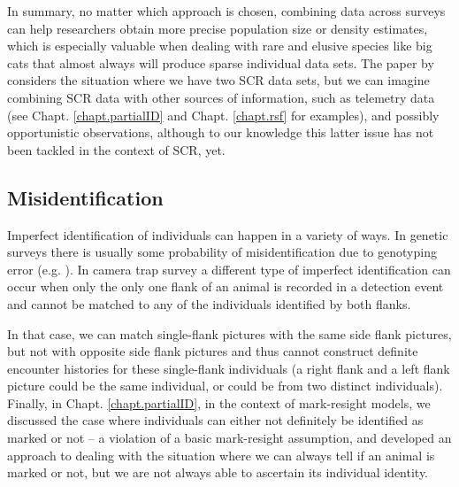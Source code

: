 In summary, no matter which approach is chosen, combining data across
surveys can help researchers %
obtain more precise population size or
density
estimates, which is especially valuable when dealing with rare and
elusive species like big cats that almost always will produce sparse
individual data sets.
The paper by \citet{gopalaswamy_etal:2012mee} considers the
situation where we have two SCR data sets, but we can imagine
combining SCR data with other sources of information, such as
telemetry data (see Chapt. \ref{chapt.partialID} and
Chapt. \ref{chapt.rsf} for examples), and possibly opportunistic
observations, although to our knowledge this latter issue has not been
tackled in the context of SCR, yet.


\subsection{Misidentification}

Imperfect identification of individuals can happen in a variety of
ways. In genetic surveys there is usually some probability of
misidentification due to genotyping error
(e.g. \citet{lukacs_burnham:2005}). In camera trap survey a different
type of imperfect identification can occur when only the only one
flank of an animal is recorded in a detection event and %
cannot be matched to any of the individuals identified by both flanks.

In that case, we can match single-flank pictures with the same
side flank pictures, but not with opposite side flank pictures and
thus cannot construct definite encounter histories for these
single-flank individuals (a right flank and a left flank picture could
be the same individual, or could be from two distinct
individuals). Finally, in Chapt. \ref{chapt.partialID}, in the context
of mark-resight models, we discussed the case where individuals can
either not definitely be identified as marked or not -- a violation of
a basic mark-resight assumption, and developed an approach to dealing
with the situation where we can always tell if an animal is marked or
not, but we are not always able to ascertain its individual identity.

